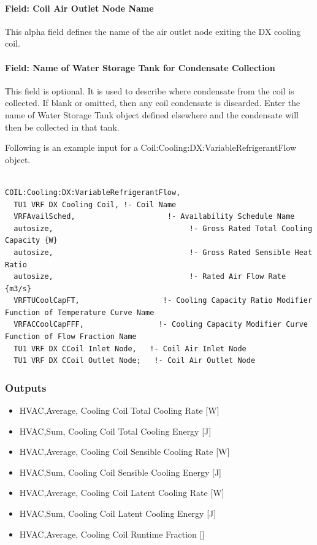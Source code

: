 \paragraph{Field: Coil Air Outlet Node Name}\label{field-coil-air-outlet-node-name}

This alpha field defines the name of the air outlet node exiting the DX cooling coil.

\paragraph{Field: Name of Water Storage Tank for Condensate Collection}\label{field-name-of-water-storage-tank-for-condensate-collection}

This field is optional. It is used to describe where condensate from the coil is collected. If blank or omitted, then any coil condensate is discarded. Enter the name of Water Storage Tank object defined elsewhere and the condensate will then be collected in that tank.

Following is an example input for a Coil:Cooling:DX:VariableRefrigerantFlow object.

\begin{lstlisting}

COIL:Cooling:DX:VariableRefrigerantFlow,
  TU1 VRF DX Cooling Coil, !- Coil Name
  VRFAvailSched,                     !- Availability Schedule Name
  autosize,                               !- Gross Rated Total Cooling Capacity {W}
  autosize,                               !- Gross Rated Sensible Heat Ratio
  autosize,                               !- Rated Air Flow Rate {m3/s}
  VRFTUCoolCapFT,                   !- Cooling Capacity Ratio Modifier Function of Temperature Curve Name
  VRFACCoolCapFFF,                 !- Cooling Capacity Modifier Curve Function of Flow Fraction Name
  TU1 VRF DX CCoil Inlet Node,   !- Coil Air Inlet Node
  TU1 VRF DX CCoil Outlet Node;   !- Coil Air Outlet Node
\end{lstlisting}

\subsubsection{Outputs}\label{outputs-5-003}

\begin{itemize}
\item
  HVAC,Average, Cooling Coil Total Cooling Rate {[}W{]}
\item
  HVAC,Sum, Cooling Coil Total Cooling Energy {[}J{]}
\item
  HVAC,Average, Cooling Coil Sensible Cooling Rate {[}W{]}
\item
  HVAC,Sum, Cooling Coil Sensible Cooling Energy {[}J{]}
\item
  HVAC,Average, Cooling Coil Latent Cooling Rate {[}W{]}
\item
  HVAC,Sum, Cooling Coil Latent Cooling Energy {[}J{]}
\item
  HVAC,Average, Cooling Coil Runtime Fraction {[]}
\end{itemize}

